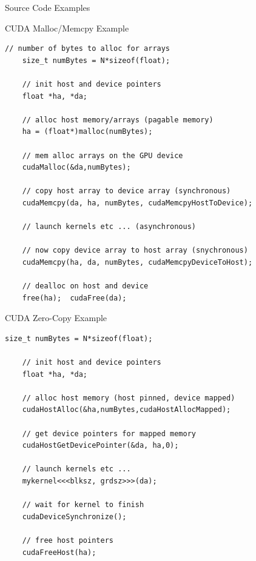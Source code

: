 \documentclass{beamer}
\begin{document}
\begin{frame}
\begin{center}Source Code Examples\end{center}
\end{frame}

%

\begin{frame}[fragile]{CUDA Malloc/Memcpy Example}
\begin{lstlisting}[caption={The classic CUDA memory initialization strategy.}]
    // number of bytes to alloc for arrays
    size_t numBytes = N*sizeof(float);

    // init host and device pointers
    float *ha, *da;

    // alloc host memory/arrays (pagable memory)
    ha = (float*)malloc(numBytes);

    // mem alloc arrays on the GPU device
    cudaMalloc(&da,numBytes);

    // copy host array to device array (synchronous)
    cudaMemcpy(da, ha, numBytes, cudaMemcpyHostToDevice);

    // launch kernels etc ... (asynchronous)

    // now copy device array to host array (snychronous)
    cudaMemcpy(ha, da, numBytes, cudaMemcpyDeviceToHost);

    // dealloc on host and device
    free(ha);  cudaFree(da);

\end{lstlisting}
\end{frame}

\begin{frame}[fragile]{CUDA Zero-Copy Example}
\begin{lstlisting}[caption={Using cudaHostAlloc allows CUDA kernels to read and write those memory addresses.  Note that kernel launch must reference device pointer.  Only use zero-copy strategy with small amounts of data since the data is not cached on the GPU.}]
    size_t numBytes = N*sizeof(float);

    // init host and device pointers
    float *ha, *da;

    // alloc host memory (host pinned, device mapped)
    cudaHostAlloc(&ha,numBytes,cudaHostAllocMapped);

    // get device pointers for mapped memory
    cudaHostGetDevicePointer(&da, ha,0);

    // launch kernels etc ...
    mykernel<<<blksz, grdsz>>>(da);

    // wait for kernel to finish
    cudaDeviceSynchronize();

    // free host pointers
    cudaFreeHost(ha);
\end{lstlisting}
\end{frame}
\end{document}
